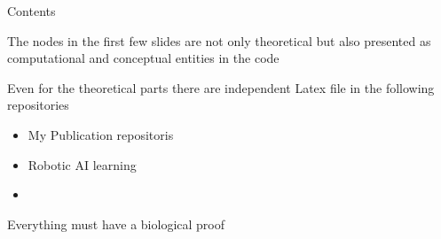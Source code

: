 \begin{frame}[allowframebreaks]{Contents}
    
    The nodes in the first few slides are not only theoretical but also presented as computational and conceptual entities in the code
    
    Even for the theoretical parts there are independent Latex file in the following repositories
    \begin{itemize}
        \item My Publication repositoris 
        \item Robotic AI learning
        \item 
    \end{itemize}
    
    
    
    Everything must have a biological proof
    
\end{frame}